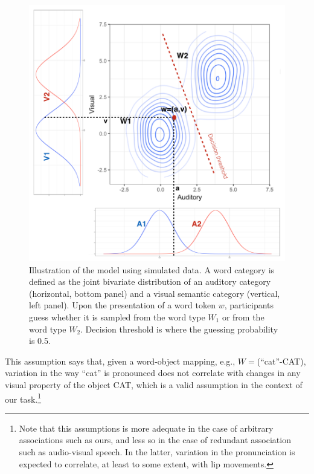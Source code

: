 \documentclass[english,floatsintext,man]{apa6}
\theoremstyle{definition}
\theoremstyle{definition}
\theoremstyle{definition}
\theoremstyle{remark}
\begin{document}
\begin{figure}[!h]
\includegraphics[width=\textwidth]{pictures/model} \caption{Illustration of the model using simulated data. A word category is defined as the joint bivariate distribution of an auditory category (horizontal, bottom panel) and a visual semantic category (vertical, left panel). Upon the presentation of a word token $w$, participants guess whether it is sampled from the word type $W_1$ or from the word type $W_2$. Decision threshold is where the guessing probability is 0.5.}\label{fig:model}
\end{figure}

\noindent This assumption says that, given a word-object mapping, e.g.,
\(W=\)(\enquote{cat}-CAT), variation in the way \enquote{cat} is
pronounced does not correlate with changes in any visual property of the
object CAT, which is a valid assumption in the context of our
task.\footnote{Note that this assumptions is more adequate in the case of arbitrary associations such as ours, and less so in the case of redundant association such as audio-visual speech. In the latter, variation in the pronunciation is expected to correlate, at least to some extent, with lip movements.}
\end{document}
